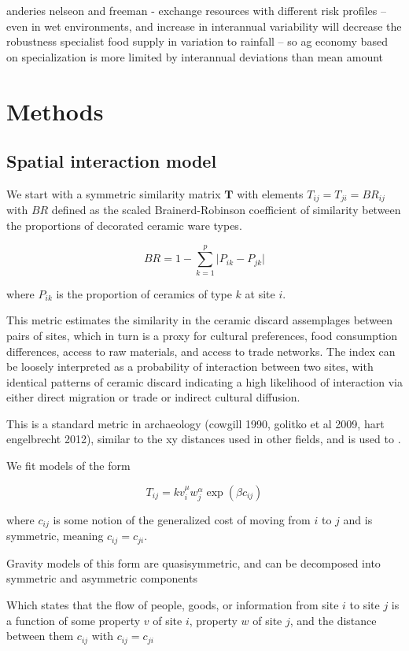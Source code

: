 \documentclass[fleqn,10pt]{wlscirep}
\begin{document}
anderies nelseon and freeman - exchange resources with different risk profiles -- even in wet environments, and increase in interannual variability will decrease the robustness specialist food supply in variation to rainfall -- so ag economy based on specialization is more limited by interannual deviations than mean amount

\section*{Methods}


\subsection*{Spatial interaction model}

We start with a symmetric similarity matrix $\mathbf{T}$ with elements $T_{ij} = T_{ji} = BR_{ij}$ with $BR$ defined as the scaled Brainerd-Robinson coefficient of similarity between the proportions of decorated ceramic ware types.

$$BR = 1 - \sum_{k=1}^{p} \lvert P_{ik} - P_{jk} \rvert$$

where $P_{ik}$ is the proportion of ceramics of type $k$ at site $i$.

This metric estimates the similarity in the ceramic discard assemplages between pairs of sites, which in turn is a proxy for cultural preferences, food consumption differences, access to raw materials, and access to trade networks. The index can be loosely interpreted as a probability of interaction between two sites, with identical patterns of ceramic discard indicating a high likelihood of interaction via either direct migration or trade or indirect cultural diffusion.

This is a standard metric in archaeology (cowgill 1990, golitko et al 2009, hart engelbrecht 2012), similar to the xy distances used in other fields, and is used to .

We fit models of the form

$$T_{ij} = k v_i^\mu w_j^\alpha \exp(\beta c_{ij})$$

where $c_{ij}$ is some notion of the generalized cost of moving from $i$ to $j$ and is symmetric, meaning $c_{ij} = c_{ji}$.

Gravity models of this form are quasisymmetric, and can be decomposed into symmetric and asymmetric components


Which states that the flow of people, goods, or information from site $i$ to site $j$ is a function of some property $v$ of site $i$, property $w$ of site $j$, and the distance between them $c_{ij}$ with $c_{ij} = c_{ji}$
\end{document}
